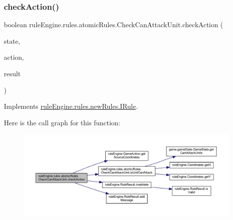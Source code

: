\subsubsection{\texorpdfstring{check\+Action()}{checkAction()}}
{\footnotesize\ttfamily boolean rule\+Engine.\+rules.\+atomic\+Rules.\+Check\+Can\+Attack\+Unit.\+check\+Action (\begin{DoxyParamCaption}\item[{\mbox{\hyperlink{classgame_1_1game_state_1_1_game_state}{Game\+State}}}]{state,  }\item[{\mbox{\hyperlink{classrule_engine_1_1_game_action}{Game\+Action}}}]{action,  }\item[{\mbox{\hyperlink{classrule_engine_1_1_rule_result}{Rule\+Result}}}]{result }\end{DoxyParamCaption})\hspace{0.3cm}{\ttfamily [inline]}}



Implements \mbox{\hyperlink{interfacerule_engine_1_1rules_1_1new_rules_1_1_i_rule_a72ce29a47d7a5fba75a09444a50a481e}{rule\+Engine.\+rules.\+new\+Rules.\+I\+Rule}}.

Here is the call graph for this function\+:
\nopagebreak
\begin{figure}[H]
\begin{center}
\leavevmode
\includegraphics[width=350pt]{classrule_engine_1_1rules_1_1atomic_rules_1_1_check_can_attack_unit_a12e775dc4a03dbda55a2d20d4a7138da_cgraph}
\end{center}
\end{figure}
\mbox{\label{classrule_engine_1_1rules_1_1atomic_rules_1_1_check_can_attack_unit_a3cf631790ea887c5d1fe3a438f3224dc}} 
